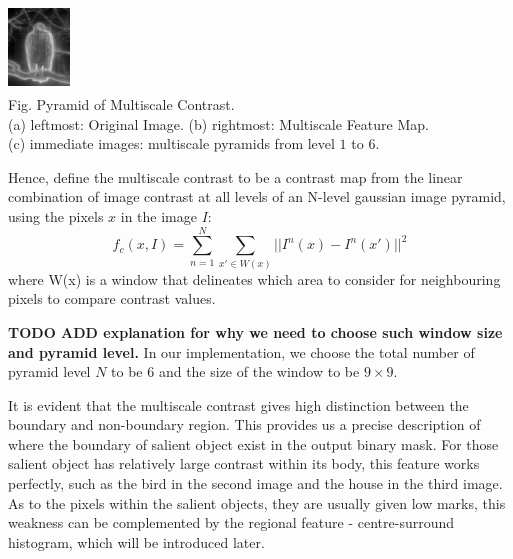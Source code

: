 \documentclass[10pt,twocolumn,letterpaper]{article}
\newcommand{\SUM}{\sum\limits}
\newcommand{\BOLD}{\textbf}
\begin{document}
\begin{center}
    \includegraphics[width=0.65in,height=0.9in]{./Figures/pyramid/5_145_145839.jpg} \\
    \footnotesize Fig. Pyramid of Multiscale Contrast.  \\
    (a) leftmost: Original Image. (b) rightmost: Multiscale Feature Map. \\
    (c) immediate images: multiscale pyramids from level $1$ to $6$.
    \end{center}

Hence, define the multiscale contrast to be a contrast map from the linear combination of image contrast at all levels of an N-level
gaussian image pyramid, using the pixels $x$ in the image $I$: $$f_c(x,I) = \SUM_{n = 1}^{N}\SUM_{x'\in W(x)}||I^n(x)-I^n(x')||^2$$ where W(x) is a window that delineates which area to consider for neighbouring pixels to compare contrast values.

\BOLD{TODO ADD explanation for why we need to choose such window size and pyramid level.}
In our implementation, we choose the total number of pyramid level $N$ to be $6$ and the size of the window to be $9 \times 9$. 

It is evident that the multiscale contrast gives high distinction between the boundary and non-boundary region. This provides us a precise description of where the boundary of salient object exist in the output binary mask. For those salient object has relatively large contrast within its body, this feature works perfectly, such as the bird in the second image and the house in the third image. As to the pixels within the salient objects, they are usually given low marks, this weakness can be complemented by the regional feature - centre-surround histogram, which will be introduced later.
\end{document}
